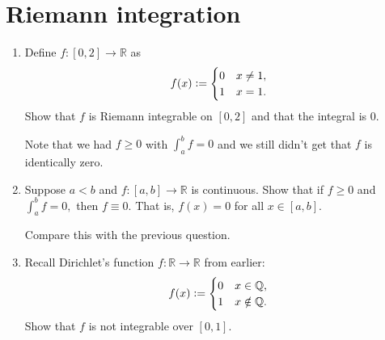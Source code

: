 \documentclass{article}
\begin{document}
\section{Riemann integration}
\begin{enumerate}
	\item Define $f:[0, 2] \to \mathbb{R}$ as 
	\begin{equation*} 
		f(x) \vcentcolon= \begin{cases}
			0 & x \neq 1,\\
			1 & x = 1.
		\end{cases}
	\end{equation*}
	Show that $f$ is Riemann integrable on $[0, 2]$ and that the integral is $0.$

	Note that we had $f \ge 0$ with $\int_{a}^{b} f = 0$ and we still didn't get that $f$ is identically zero.
	\item Suppose $a < b$ and $f:[a, b] \to \mathbb{R}$ is continuous. Show that if $f \ge 0$ and $\int_{a}^{b} f = 0,$ then $f \equiv 0.$ That is, $f(x) = 0$ for all $x \in [a, b].$

	Compare this with the previous question.
	\item Recall Dirichlet's function $f:\mathbb{R}\to\mathbb{R}$ from earlier:
	\begin{equation*} 
		f(x) \vcentcolon= \begin{cases}
			0 & x \in \mathbb{Q},\\
			1 & x \notin \mathbb{Q}.
		\end{cases}
	\end{equation*}
	Show that $f$ is not integrable over $[0, 1].$
\end{enumerate}
\end{document}
